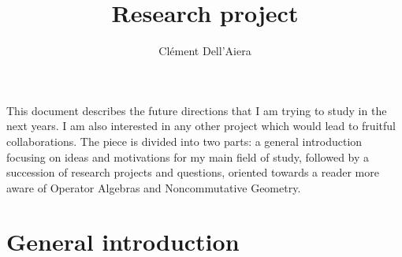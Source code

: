 \documentclass[a4paper]{article}
\title{Research project}
\date{}
\author{ Cl\'ement Dell'Aiera}
\begin{document}
\maketitle
This document describes the future directions that I am trying to study in the next years. I am also interested in any other project which would lead to fruitful collaborations. The piece is divided into two parts: a general introduction focusing on ideas and motivations for my main field of study, followed by a succession of research projects and questions, oriented towards a reader more aware of Operator Algebras and Noncommutative Geometry. \\

\section{General introduction}





 
\end{document}
